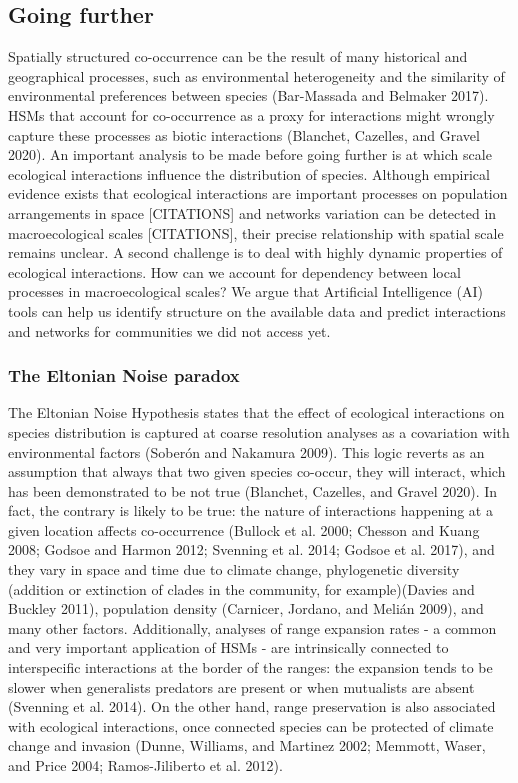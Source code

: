 \documentclass[12pt]{article}
\begin{document}
\hypertarget{going-further}{%
\subsection{Going further}\label{going-further}}

Spatially structured co-occurrence can be the result of many historical
and geographical processes, such as environmental heterogeneity and the
similarity of environmental preferences between species (Bar-Massada and
Belmaker 2017). HSMs that account for co-occurrence as a proxy for
interactions might wrongly capture these processes as biotic
interactions (Blanchet, Cazelles, and Gravel 2020). An important
analysis to be made before going further is at which scale ecological
interactions influence the distribution of species. Although empirical
evidence exists that ecological interactions are important processes on
population arrangements in space {[}CITATIONS{]} and networks variation
can be detected in macroecological scales {[}CITATIONS{]}, their precise
relationship with spatial scale remains unclear. A second challenge is
to deal with highly dynamic properties of ecological interactions. How
can we account for dependency between local processes in macroecological
scales? We argue that Artificial Intelligence (AI) tools can help us
identify structure on the available data and predict interactions and
networks for communities we did not access yet.

\hypertarget{the-eltonian-noise-paradox}{%
\subsubsection{The Eltonian Noise
paradox}\label{the-eltonian-noise-paradox}}

The Eltonian Noise Hypothesis states that the effect of ecological
interactions on species distribution is captured at coarse resolution
analyses as a covariation with environmental factors (Soberón and
Nakamura 2009). This logic reverts as an assumption that always that two
given species co-occur, they will interact, which has been demonstrated
to be not true (Blanchet, Cazelles, and Gravel 2020). In fact, the
contrary is likely to be true: the nature of interactions happening at a
given location affects co-occurrence (Bullock et al. 2000; Chesson and
Kuang 2008; Godsoe and Harmon 2012; Svenning et al. 2014; Godsoe et al.
2017), and they vary in space and time due to climate change,
phylogenetic diversity (addition or extinction of clades in the
community, for example)(Davies and Buckley 2011), population density
(Carnicer, Jordano, and Melián 2009), and many other factors.
Additionally, analyses of range expansion rates - a common and very
important application of HSMs - are intrinsically connected to
interspecific interactions at the border of the ranges: the expansion
tends to be slower when generalists predators are present or when
mutualists are absent (Svenning et al. 2014). On the other hand, range
preservation is also associated with ecological interactions, once
connected species can be protected of climate change and invasion
(Dunne, Williams, and Martinez 2002; Memmott, Waser, and Price 2004;
Ramos-Jiliberto et al. 2012).
\end{document}
